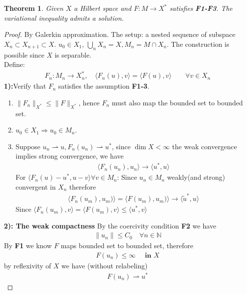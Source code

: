 \documentclass[a4paper,11pt,oneside,fleqn]{book}
\newtheorem{theorem}{Theorem}[section]
\theoremstyle{definition}
\theoremstyle{remark}
\begin{document}
\begin{theorem}
	Given $X$ a Hilbert space and $F: M \rightarrow X^*$ satisfies \textbf{F1-F3}. The variational inequality admits a solution. 
\end{theorem}
\begin{proof}
	By Galerkin approximation. The setup: a nested sequence of subspace $X_n \subset X_{n + 1} \subset X$. $u_0 \in X_1$, $\bigcup_n X_n = X, M_n = M \cap X_n$. The construction is possible since $X$ is separable. \\
	Define:
	\begin{align*}
		F_n: M_n \rightarrow X_n^*, \quad \langle F_n(u), v \rangle = \langle F(u), v \rangle \qquad \forall v \in X_n
	\end{align*}
	\textbf{1):}Verify that $F_n$ satisfies the assumption \textbf{F1-3}.
	\begin{enumerate}
		\item $\|F_n\|_{X^*} \le \|F\|_{X^*}$, hence $F_n$ must also map the bounded set to bounded set. 
		\item $u_0 \in X_1 \Rightarrow u_0 \in M_n$.
		\item Suppose $u_n \rightharpoonup u, F_n(u_n) \rightharpoonup u^*$, since $\dim X < \infty$ the weak convergence implies strong convergence, we have
		\begin{align*}
			\langle F_n(u_n), u_n \rangle \rightarrow \langle u^*, u \rangle  
		\end{align*}
		For $\langle F_n(u) - u^*, u - v \rangle \forall v \in M_n$: Since $u_n \in M_n$ weakly(and strong) convergent in $X_n$  therefore  
		\begin{align*}
			\langle F_n(u_m), u_m) \rangle = \langle F(u_m), u_m) \rangle \rightarrow \langle \tilde{u}^*, u\rangle
		\end{align*}
		Since $\langle F_n(u_m), v \rangle = \langle F(u_m), v \rangle \le \langle u^*, v \rangle$
	\end{enumerate}
	\textbf{2): The weak compactness}
	By the coercivity condition \textbf{F2} we have
	\begin{align*}
		\|u_n\| \le C_0 \quad \forall n \in \mathbb{N}
	\end{align*}
	By \textbf{F1} we know $F$ maps bounded set to bounded set, therefore
	\begin{align*}
		F(u_n) \le \infty \quad \textbf{ in } X
	\end{align*}  
	by reflexivity of $X$ we have (without relabeling)
	\begin{align*}
		F(u_n) \rightharpoonup u^*

\end{align*}
\end{proof}
\end{document}
